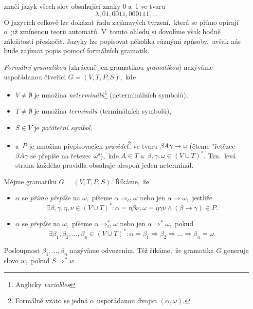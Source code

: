 značí jazyk všech slov obsahující znaky $0$ a~$1$ ve tvaru
\[\lambda,01,0011,000111,\ldots\]
O jazycích celkově lze dokázat řadu zajímavých tvrzení,~která se přímo opírají o~již zmínenou teorii automatů. V~tomto ohledu si dovolíme však hodně záležitostí přeskočit. Jazyky lze popisovat několika různými způsoby,~avšak nás bude zajímat popis pomocí formálních gramatik.
\begin{definition}\label{def:formalni-gramatika}
    \emph{Formální gramatikou} (zkráceně jen gramatikou \emph{gramatikou}) nazýváme uspořádanou čtveřici $G=(V,T,P,S)$,~kde
    \begin{itemize}
        \item $V\neq\emptyset$ je množina \emph{neterminálů}\footnote{Anglicky \emph{variables}} (neterminálních symbolů),
        \item $T\neq\emptyset$ je množina \emph{terminálů} (terminálních symbolů),
        \item $S\in V$ je \emph{počáteční symbol},
        \item a~$P$ je množina přepisovacích \emph{pravidel}\footnote{Formálně vzato se jedná o~uspořádanou dvojici $(\alpha,\omega)$.} ve tvaru $\beta A\gamma\to\omega$ (čteme "řetězec $\beta A\gamma$ se přepíše na řetezec $\omega$"),~kde $A\in T$ a~$\beta,\gamma,\omega\in(V\cup T)^*$. Tzn.~levá strana každého pravidla obsahuje alespoň jeden neterminál.
    \end{itemize}
\end{definition}
\begin{definition}\label{def:odvozeni-slova-v-gramatice}
    Mějme gramatiku $G=(V,T,P,S)$. Říkáme,~že
    \begin{itemize}
        \item $\alpha$ se \emph{přímo přepíše} na $\omega$,~píšeme $\alpha\Rightarrow_G\omega$ nebo jen $\alpha\Rightarrow\omega$,~jestliže
        \[\exists\beta,\gamma,\eta,\nu\in(V\cup T)^*: \alpha=\eta\beta\nu,\omega=\eta\gamma\nu\land(\beta\to\gamma)\in P.\]
        \item $\alpha$ se \emph{přepíše} na $\omega$,~píšeme $\alpha\Rightarrow_G^*\omega$ nebo jen $\alpha\Rightarrow^*\omega$,~pokud
        \[\exists\beta_1,\beta_2,\ldots,\beta_n\in(V\cup T)^*:\alpha=\beta_1\Rightarrow\beta_2\Rightarrow\dots\Rightarrow\beta_n=\omega.\]
    \end{itemize}
    Posloupnost $\beta_1,\ldots,\beta_n$ nazýváme odvozením. Též říkáme,~že gramatika $G$ generuje slovo $w$,~pokud $S\Rightarrow^* w$.
\end{definition}
